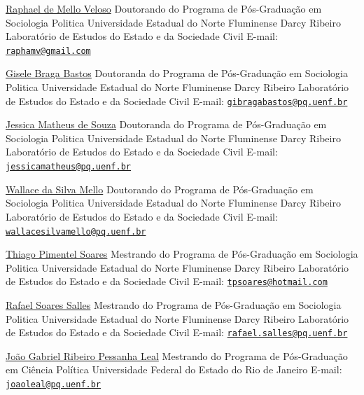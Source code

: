 \documentclass[
  12pt,
]{report}
\begin{document}
\href{http://lattes.cnpq.br/9433034841064768}{Raphael de Mello Veloso}
\hfill\break Doutorando do Programa de Pós-Graduação em Sociologia
Politica \hfill\break Universidade Estadual do Norte Fluminense Darcy
Ribeiro \hfill\break Laboratório de Estudos do Estado e da Sociedade
Civil \hfill\break E-mail:
\href{mailto:raphamv@gmail.com}{\nolinkurl{raphamv@gmail.com}}
\hfill\break

\href{http://lattes.cnpq.br/1675744772217864}{Gisele Braga Bastos}
\hfill\break Doutoranda do Programa de Pós-Graduação em Sociologia
Politica \hfill\break Universidade Estadual do Norte Fluminense Darcy
Ribeiro \hfill\break Laboratório de Estudos do Estado e da Sociedade
Civil \hfill\break E-mail:
\href{mailto:gibragabastos@pq.uenf.br}{\nolinkurl{gibragabastos@pq.uenf.br}}
\hfill\break

\href{http://lattes.cnpq.br/6717255818088404}{Jessica Matheus de Souza}
\hfill\break Doutoranda do Programa de Pós-Graduação em Sociologia
Politica \hfill\break Universidade Estadual do Norte Fluminense Darcy
Ribeiro \hfill\break Laboratório de Estudos do Estado e da Sociedade
Civil \hfill\break E-mail:
\href{mailto:jessicamatheus@pq.uenf.br}{\nolinkurl{jessicamatheus@pq.uenf.br}}
\hfill\break

\href{http://lattes.cnpq.br/8178088513307546}{Wallace da Silva Mello}
\hfill\break Doutorando do Programa de Pós-Graduação em Sociologia
Politica \hfill\break Universidade Estadual do Norte Fluminense Darcy
Ribeiro \hfill\break Laboratório de Estudos do Estado e da Sociedade
Civil \hfill\break E-mail:
\href{mailto:wallacesilvamello@pq.uenf.br}{\nolinkurl{wallacesilvamello@pq.uenf.br}}
\hfill\break

\href{http://lattes.cnpq.br/5038496684551538}{Thiago Pimentel Soares}
\hfill\break Mestrando do Programa de Pós-Graduação em Sociologia
Politica \hfill\break Universidade Estadual do Norte Fluminense Darcy
Ribeiro \hfill\break Laboratório de Estudos do Estado e da Sociedade
Civil \hfill\break E-mail:
\href{mailto:tpsoares@hotmail.com}{\nolinkurl{tpsoares@hotmail.com}}
\hfill\break

\href{http://lattes.cnpq.br/6781198318316057}{Rafael Soares Salles}
\hfill\break Mestrando do Programa de Pós-Graduação em Sociologia
Politica \hfill\break Universidade Estadual do Norte Fluminense Darcy
Ribeiro \hfill\break Laboratório de Estudos do Estado e da Sociedade
Civil \hfill\break  E-mail:
\href{mailto:rafael.salles@pq.uenf.br}{\nolinkurl{rafael.salles@pq.uenf.br}}
\hfill\break

\href{http://lattes.cnpq.br/9277299850069272}{João Gabriel Ribeiro
Pessanha Leal} \hfill\break Mestrando do Programa de Pós-Graduação em
Ciência Política \hfill\break Universidade Federal do Estado do Rio de
Janeiro \hfill\break E-mail:
\href{mailto:joaoleal@pq.uenf.br}{\nolinkurl{joaoleal@pq.uenf.br}}
\hfill\break
\end{document}
